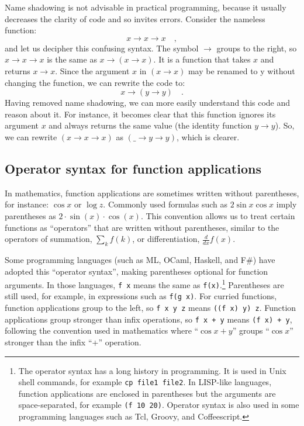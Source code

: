 Name shadowing is not advisable in practical programming, because
it usually decreases the clarity of code and so invites errors. Consider
the nameless function:
\[
x\rightarrow x\rightarrow x\quad,
\]
and let us decipher this confusing syntax. The symbol $\rightarrow$
groups to the right, so $x\rightarrow x\rightarrow x$ is the same
as $x\rightarrow\left(x\rightarrow x\right)$. It is a function that
takes $x$ and returns $x\rightarrow x$. Since the argument $x$
in $\left(x\rightarrow x\right)$ may be renamed to y without changing
the function, we can rewrite the code to:
\[
x\rightarrow\left(y\rightarrow y\right)\quad.
\]
Having removed name shadowing, we can more easily understand this
code and reason about it. For instance, it becomes clear that this
function ignores its argument $x$ and always returns the same value
(the identity function $y\rightarrow y$). So, we can rewrite $\left(x\rightarrow x\rightarrow x\right)$
as $\left(\_\rightarrow y\rightarrow y\right)$, which is clearer.

\subsection{Operator syntax for function applications}

In mathematics, function applications are sometimes written without
parentheses, for instance: $\cos x$ or $\log z$. Commonly used formulas
such as $2\sin x\cos x$ imply parentheses as $2\cdot\sin\left(x\right)\cdot\cos\left(x\right)$.
This convention allows us to treat certain functions as \textsf{``}operators\textsf{''}
that are written without parentheses, similar to the operators of
summation, $\sum_{k}f(k)$, or differentiation, $\frac{d}{dx}f(x)$.

Some programming languages (such as ML, OCaml, Haskell, and F\#) have
adopted this \textsf{``}operator syntax\textsf{''}, making
parentheses optional for function arguments. In those languages, \lstinline!f x!
means the same as \lstinline!f(x)!.\footnote{The operator syntax has a long history in programming. It is used
in Unix shell commands, for example \lstinline!cp file1 file2!. In
LISP-like languages, function applications are enclosed in parentheses
but the arguments are space-separated, for example \lstinline!(f 10 20)!.
Operator syntax is also used in some programming languages such as
Tcl, Groovy, and Coffeescript.} Parentheses are still used, for example, in expressions such as \lstinline!f(g x)!.
For curried functions, function applications group to the left, so
\lstinline!f x y z! means \lstinline!((f x) y) z!. Function applications
group stronger than infix operations, so \lstinline!f x + y! means
\lstinline!(f x) + y!, following the convention used in mathematics
where \textsf{``}$\cos x+y$\textsf{''} groups \textsf{``}$\cos x$\textsf{''} stronger than the infix
\textsf{``}$+$\textsf{''} operation.

